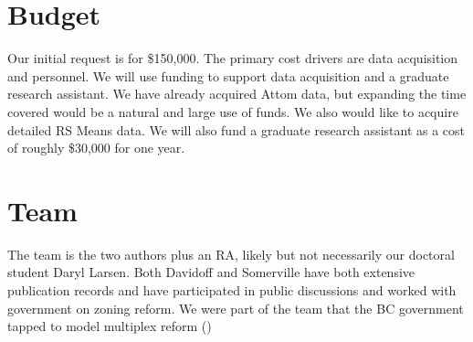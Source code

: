 \documentclass[12pt]{article}
\begin{document}
\section{Budget}

Our initial request is for \$150,000. The primary cost drivers are data acquisition and personnel. We will use funding to support data acquisition and a graduate research assistant. We have already acquired Attom data, but expanding the time covered would be a natural and large use of funds. We also would like to acquire detailed RS Means data. We will also fund a graduate research assistant as a cost of roughly \$30,000 for one year.

\section{Team}

The team is the two authors plus an RA, likely but not necessarily our doctoral student Daryl Larsen. Both Davidoff and Somerville have both extensive publication records and have participated in public discussions and worked with government on zoning reform. We were part of the team that the BC government tapped to model multiplex reform (\textcite{vonBergmann_etal_2023})

\printbibliography
\end{document}
